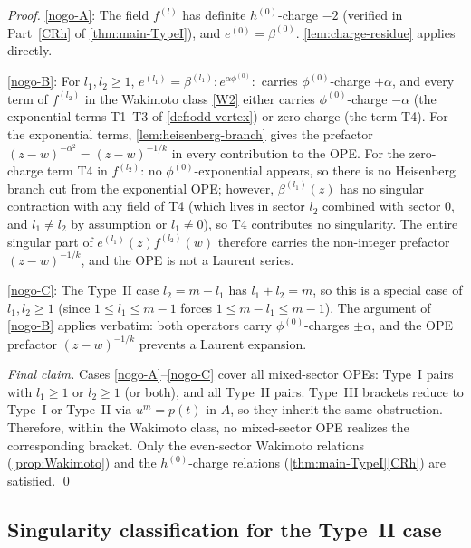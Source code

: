 \documentclass[12pt]{article}
\theoremstyle{plain}
\theoremstyle{definition}
\theoremstyle{remark}
\newcommand{\bl}[1]{\beta^{(#1)}}
\newcommand{\el}[1]{e^{(#1)}}
\newcommand{\fl}[1]{f^{(#1)}}
\newcommand{\no}[1]{:\!#1\!:}
\begin{document}
\begin{proof}
  \ref{nogo-A}:
  The field $\fl{l}$ has definite $h^{(0)}$-charge $-2$
  (verified in Part~\ref{CRh} of \cref{thm:main-TypeI}),
  and $\el{0}=\bl{0}$.
  \cref{lem:charge-residue} applies directly.

  \ref{nogo-B}:
  For $l_1,l_2\geq 1$, $\el{l_1}=\bl{l_1}\no{e^{\alpha\phi^{(0)}}}$ carries
  $\phi^{(0)}$-charge $+\alpha$, and every term of $\fl{l_2}$ in the Wakimoto
  class \ref{W2} either carries $\phi^{(0)}$-charge $-\alpha$ (the exponential
  terms T1--T3 of \cref{def:odd-vertex}) or zero charge (the term T4).
  For the exponential terms, \cref{lem:heisenberg-branch} gives the prefactor
  $(z-w)^{-\alpha^2}=(z-w)^{-1/k}$ in every contribution to the OPE.
  For the zero-charge term T4 in $\fl{l_2}$: no $\phi^{(0)}$-exponential appears,
  so there is no Heisenberg branch cut from the exponential OPE; however,
  $\bl{l_1}(z)$ has no singular contraction with any field of T4 (which lives
  in sector $l_2$ combined with sector $0$, and $l_1\neq l_2$ by assumption
  or $l_1\neq 0$), so T4 contributes no singularity.
  The entire singular part of $\el{l_1}(z)\fl{l_2}(w)$ therefore carries
  the non-integer prefactor $(z-w)^{-1/k}$, and the OPE is not a Laurent series.

  \ref{nogo-C}:
  The Type~II case $l_2=m-l_1$ has $l_1+l_2=m$, so this is a special case of
  $l_1,l_2\geq 1$ (since $1\leq l_1\leq m-1$ forces $1\leq m-l_1\leq m-1$).
  The argument of \ref{nogo-B} applies verbatim: both operators carry
  $\phi^{(0)}$-charges $\pm\alpha$, and the OPE prefactor $(z-w)^{-1/k}$
  prevents a Laurent expansion.

  \emph{Final claim.}
  Cases \ref{nogo-A}--\ref{nogo-C} cover all mixed-sector OPEs: Type~I pairs
  with $l_1\geq 1$ or $l_2\geq 1$ (or both), and all Type~II pairs.
  Type~III brackets reduce to Type~I or Type~II via $u^m=p(t)$ in $A$, so they
  inherit the same obstruction.
  Therefore, within the Wakimoto class, no mixed-sector OPE realizes the
  corresponding bracket.
  Only the even-sector Wakimoto relations (\cref{prop:Wakimoto}) and the
  $h^{(0)}$-charge relations (\cref{thm:main-TypeI}\ref{CRh}) are satisfied. \qed
\end{proof}

\subsection{Singularity classification for the Type~II case}
\label{subsec:TypeII-classify}
\end{document}

